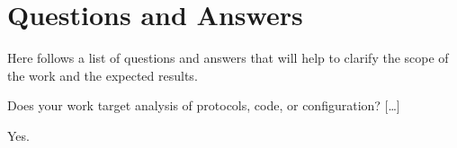 \section{Questions and Answers}

Here follows a list of questions and answers that will help to clarify the scope of the work and the expected results.

\begin{question}
    Does your work target analysis of protocols, code, or configuration? {[\dots]}
\end{question}

\begin{answer}
    Yes.
\end{answer}